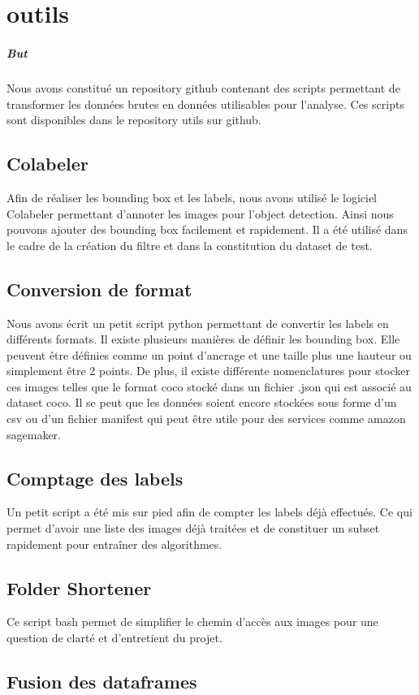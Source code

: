 \chapter{outils}

\paragraph*{But}

Nous avons constitué un repository github contenant des scripts permettant de transformer les données brutes en données utilisables pour l'analyse. Ces scripts sont disponibles dans le repository utils sur github.

\section{Colabeler}

Afin de réaliser les bounding box et les labels, nous avons utilisé le logiciel Colabeler permettant d'annoter les images pour l'object detection. Ainsi nous pouvons ajouter des bounding box facilement et rapidement. Il a été utilisé dans le cadre de la création du filtre et dans la constitution du dataset de test.

\section{Conversion de format}

Nous avons écrit un petit script python permettant de convertir les labels en différents formats. Il existe plusieurs manières de définir les bounding box. Elle peuvent être définies comme un point d'ancrage et une taille plus une hauteur ou simplement être 2 points. De plus, il existe différente nomenclatures pour stocker ces images telles que le format coco stocké dans un fichier .json qui est associé au dataset coco. Il se peut que les données soient encore stockées sous forme d'un csv ou d'un fichier manifest qui peut être utile pour des services comme amazon sagemaker.

\section{Comptage des labels}

Un petit script a été mis sur pied afin de compter les labels déjà effectués. Ce qui permet d'avoir une liste des images déjà traitées et de constituer un subset rapidement pour entraîner des algorithmes.

\section{Folder Shortener}

Ce script bash permet de simplifier le chemin d'accès aux images pour une question de clarté et d'entretient du projet.

\section{Fusion des dataframes}


